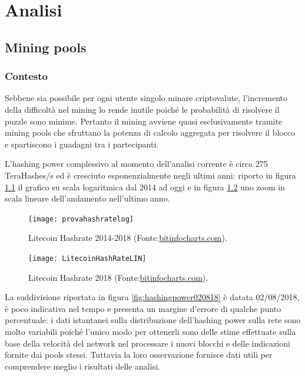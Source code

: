 
\chapter{Analisi}\label{sec:analisi}


\section{Mining pools}

\subsection{Contesto}
Sebbene sia possibile per ogni utente singolo minare criptovalute, l’incremento della difficoltà nel mining lo rende inutile poiché le probabilità di risolvere il puzzle sono minime. Pertanto il mining avviene quasi esclusivamente tramite mining pools che sfruttano la potenza di calcolo aggregata per risolvere il blocco e spartiscono i guadagni tra i partecipanti.


L’hashing power complessivo al momento dell’analisi corrente è circa 275 TeraHashes/s ed è cresciuto esponenzialmente negli ultimi anni: riporto in figura \ref{fig:provahashratelog} il grafico su scala logaritmica dal 2014 ad oggi e in figura \ref{fig:litecoinhashratelin} uno zoom in scala lineare dell’andamento nell’ultimo anno.


\begin{figure}[h]
	\texttt{[image: provahashratelog]}
	\caption{Litecoin Hashrate 2014-2018 (Fonte:\url{bitinfocharts.com}).}
	\label{fig:provahashratelog}
\end{figure}

\begin{figure}
	\centering
	\texttt{[image: LitecoinHashRateLIN]}
	\caption{Litecoin Hashrate 2018 (Fonte:\url{bitinfocharts.com}).} 
	\label{fig:litecoinhashratelin}
\end{figure}


La suddivisione riportata in figura \ref{fig:hashingpower020818} è datata 02/08/2018, è poco indicativa nel tempo e presenta un margine d’errore di qualche punto percentuale: i dati istantanei sulla distribuzione dell’hashing power sulla rete sono molto variabili poiché l’unico modo per ottenerli sono delle stime effettuate sulla base della velocità del network nel processare i nuovi blocchi e delle indicazioni fornite dai pools stessi. Tuttavia la loro osservazione fornisce dati utili per comprendere meglio i risultati delle analisi.


